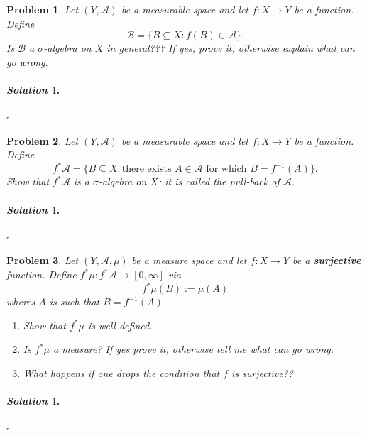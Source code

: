\documentclass[reqno]{amsart}
\theoremstyle{plain}
\newtheorem{problem}{Problem}
\theoremstyle{definition}
\newenvironment{solution1}{\paragraph{\emph{Solution $1$}.}}{\hfill$\square$}
\begin{document}
\begin{problem}
Let $(Y,\mathcal{A})$ be a measurable space and let $f:X \rightarrow Y$ be a function.  Define
$$\mathcal{B} = \{B \subseteq X : f(B) \in \mathcal{A} \}. $$
Is $\mathcal{B}$ a $\sigma$-algebra on $X$ in general???  If yes, prove it, otherwise explain what can go wrong.
\end{problem}
\begin{solution1}

\end{solution1}


\begin{problem}
Let $(Y,\mathcal{A})$ be a measurable space and let $f:X \rightarrow Y$ be a function.  Define
$$f^{*}\mathcal{A} = \{B \subseteq X : \text{there exists } A \in \mathcal{A}  \text{ for which } B = f^{-1}(A)\}. $$
Show that $f^{*}\mathcal{A}$ is a $\sigma$-algebra on $X$; it is called the pull-back of $\mathcal{A}$.
\end{problem}
\begin{solution1}

\end{solution1}


\begin{problem}
Let $(Y,\mathcal{A},\mu)$ be a measure space and let $f:X \rightarrow Y$ be a {\bfseries surjective} function.  Define $f^{*}\mu:f^{*}\mathcal{A} \rightarrow [0,\infty]$ via
$$f^{*}\mu(B) := \mu(A) $$
wheres $A$ is such that $B = f^{-1}(A)$.
\begin{enumerate}
\item Show that $f^{*}\mu$ is well-defined.
\item Is $f^{*}\mu$ a measure?  If yes prove it, otherwise tell me what can go wrong.
\item What happens if one drops the condition that $f$ is surjective??
\end{enumerate}
\end{problem}
\begin{solution1}

\end{solution1} 
\end{document}
